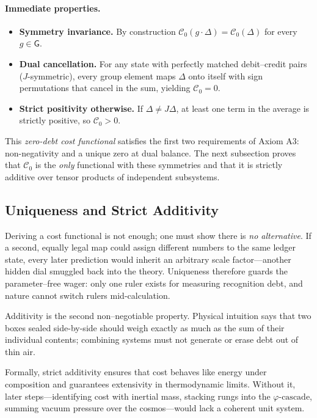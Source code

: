 \documentclass[11pt]{article}
\begin{document}
\paragraph{Immediate properties.}
\begin{itemize}
  \item \textbf{Symmetry invariance.}  By construction \( \mathcal{C}_{0}(g\!\cdot\!\Delta) = \mathcal{C}_{0}(\Delta)\) for every \(g\in\mathsf{G}\).
  \item \textbf{Dual cancellation.}  For any state with perfectly matched debit–credit pairs (\(J\)-symmetric), every group element maps \(\Delta\) onto itself with sign permutations that cancel in the sum, yielding \(\mathcal{C}_{0}=0\).
  \item \textbf{Strict positivity otherwise.}  If \(\Delta\neq J\Delta\), at least one term in the average is strictly positive, so \(\mathcal{C}_{0}>0\).
\end{itemize}

This \emph{zero-debt cost functional} satisfies the first two requirements of Axiom A3: non-negativity and a unique zero at dual balance.  The next subsection proves that \(\mathcal{C}_{0}\) is the \emph{only} functional with these symmetries and that it is strictly additive over tensor products of independent subsystems.

\subsection{Uniqueness and Strict Additivity}
\label{subsec:uniqueness-additivity}


Deriving a cost functional is not enough; one must show there is \emph{no alternative}.  
If a second, equally legal map could assign different numbers to the same ledger state, every later prediction would inherit an arbitrary scale factor—another hidden dial smuggled back into the theory.  
Uniqueness therefore guards the parameter–free wager: only one ruler exists for measuring recognition debt, and nature cannot switch rulers mid-calculation.

Additivity is the second non–negotiable property.  
Physical intuition says that two boxes sealed side-by-side should weigh exactly as much as the sum of their individual contents; combining systems must not generate or erase debt out of thin air.  

Formally, strict additivity ensures that cost behaves like energy under composition and guarantees extensivity in thermodynamic limits.  
Without it, later steps—identifying cost with inertial mass, stacking rungs into the $\varphi\text{-cascade}$, summing vacuum pressure over the cosmos—would lack a coherent unit system.
\end{document}
